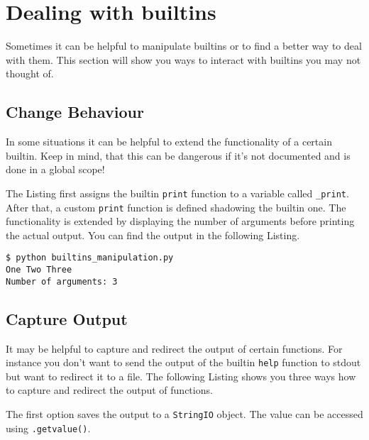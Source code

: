 
\section{Dealing with builtins}

Sometimes it can be helpful to manipulate builtins or to find a better way to deal with them.
This section will show you ways to interact with builtins you may not thought of.


\subsection{Change Behaviour}

In some situations it can be helpful to extend the functionality of a certain builtin.
Keep in mind, that this can be dangerous if it's not documented and is done in a global scope!



The Listing first assigns the builtin \lstinline{print} function to a variable called \lstinline{_print}.
After that, a custom \mbox{\lstinline{print}} function is defined shadowing the builtin one.
The functionality is extended by displaying the number of arguments before printing the actual output.
You can find the output in the following Listing.

\begin{lstlisting}[caption=Output of builtins\_manipulation.py]
$ python builtins_manipulation.py
One Two Three
Number of arguments: 3
\end{lstlisting}


\subsection{Capture Output}

It may be helpful to capture and redirect the output of certain functions.
For instance you don't want to send the output of the builtin \lstinline{help} function to stdout but want to redirect it to a file.
The following Listing shows you three ways how to capture and redirect the output of functions.



The first option saves the output to a \lstinline{StringIO} object.
The value can be accessed using \lstinline{.getvalue()}.

